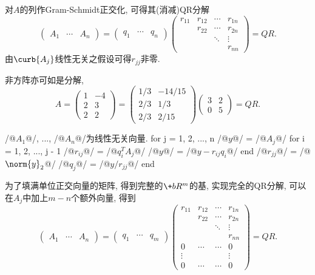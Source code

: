 \documentclass{ctexart}
\begin{document}
对$A$的列作Gram-Schmidt正交化, 可得其(消减)QR分解
\[ \begin{pmatrix}
    A_1 & \cdots & A_n
\end{pmatrix} = \begin{pmatrix}
    q_1 & \cdots & q_n
\end{pmatrix}\begin{pmatrix}
    r_{11} & r_{12} & \cdots & r_{1n} \\
    & r_{22} & \cdots & r_{2n} \\
    & & \ddots & \vdots \\
    & & & r_{nn}
\end{pmatrix} = QR. \]
由$\curb{A_j}$线性无关之假设可得$r_{jj}$非零.
\begin{ex}
    非方阵亦可如是分解,
    \[ A = \begin{pmatrix}
        1 & -4 \\
        2 & 3 \\
        2 & 2
    \end{pmatrix} = \begin{pmatrix}
        1/3 & -14/15 \\
        2/3 & 1/3 \\
        2/3 & 2/15
    \end{pmatrix} \begin{pmatrix}
        3 & 2 \\
        0 & 5
    \end{pmatrix} = QR. \]
\end{ex}
\begin{matlablst}
/@$A_1$@/, ..., /@$A_n$@/为线性无关向量.
for j = 1, 2, ..., n
    /@$y$@/ = /@$A_j$@/
    for i = 1, 2, ..., j - 1
        /@$r_{ij}$@/ = /@$q_i^T A_j$@/
        /@$y$@/ = /@$y - r_{ij}q_i$@/
    end
    /@$r_{jj}$@/ = /@$\norm{y}_2$@/
    /@$q_j$@/ = /@$y/r_{jj}$@/
end
\end{matlablst}
为了填满单位正交向量的矩阵, 得到完整的$\+bR^m$的基, 实现完全的QR分解, 可以在$A_j$中加上$m-n$个额外向量, 得到
\[ \begin{pmatrix}
    A_1 & \cdots & A_n
\end{pmatrix} = \begin{pmatrix}
    q_1 & \cdots & q_m
\end{pmatrix}\begin{pmatrix}
    r_{11} & r_{12} & \cdots & r_{1n} \\
    & r_{22} & \cdots & r_{2n} \\
    & & \ddots & \vdots \\
    & & & r_{nn} \\
    0 & \cdots & \cdots & 0 \\
    \vdots & & & \vdots \\
    0 & \cdots & \cdots & 0
\end{pmatrix} = QR. \]
\end{document}
